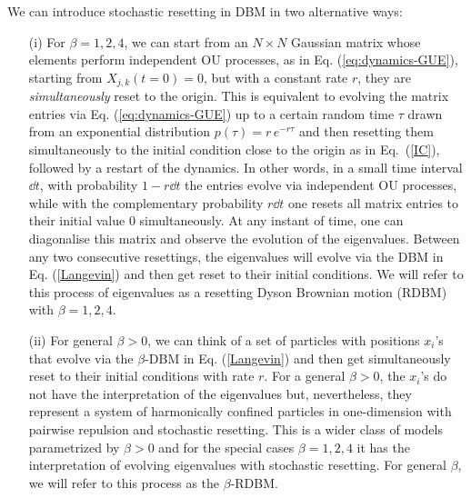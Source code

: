 \documentclass[onecolumn,superscriptaddress,
 amsmath,amssymb,
 aps,
 prd,
]{revtex4-1}
\begin{document}
\vspace*{0.5cm}
 We can introduce stochastic resetting in DBM in two alternative ways: 
\begin{itemize}

\item[(i)] For $\beta=1,2,4$, we can start from an $N \times N$ Gaussian matrix whose elements perform independent OU processes, as in Eq. (\ref{eq:dynamics-GUE}), starting from $X_{j,k}(t=0)=0$, but with a constant rate $r$, they are {\it simultaneously} reset to the origin. This is equivalent to evolving the matrix entries via Eq. (\ref{eq:dynamics-GUE}) up to a certain random time $\tau$ drawn from an exponential distribution $p(\tau) = r\, e^{- r \tau}$ and then resetting them simultaneously to the initial condition close to the origin as in Eq.~(\ref{IC}), followed by a restart of the dynamics. In other words, in a small time interval $\dd t$, with probability $1 - r \dd t$ the entries evolve via independent OU processes, while with the complementary probability $r \dd t$ one resets all matrix entries to their initial value $0$ simultaneously. At any instant of time, one can diagonalise this matrix and observe the evolution of the eigenvalues. Between any two consecutive resettings, the eigenvalues will evolve via the DBM in Eq. (\ref{Langevin}) and then get reset to their initial conditions. We will refer to this process of eigenvalues as a resetting Dyson Brownian motion (RDBM) with $\beta = 1,2,4$. 


\item[(ii)] For general $\beta > 0$, we can think of a set of particles with positions $x_i$'s that evolve via the $\beta$-DBM in Eq. (\ref{Langevin}) and then get simultaneously reset to their initial conditions with rate $r$. For a general $\beta>0$, the $x_i$'s do not have the interpretation of the eigenvalues but, nevertheless, they represent a system of harmonically confined particles in one-dimension with pairwise repulsion and stochastic resetting. This is a wider class of models parametrized by $\beta > 0$ and for the special cases $\beta = 1,2,4$ it has the interpretation of evolving eigenvalues with stochastic resetting. 
For general $\beta$, we will refer to this process as the $\beta$-RDBM. 

\end{itemize}
\end{document}
